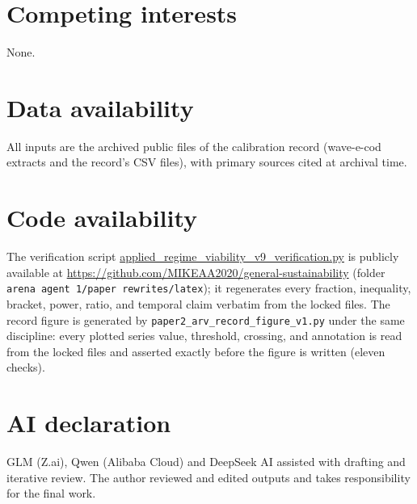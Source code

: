 \documentclass[10pt,twocolumn]{article}
\theoremstyle{plain}
\theoremstyle{remark}
\begin{document}
\section*{Competing interests}
None.

\section*{Data availability}
All inputs are the archived public files of the calibration record
(wave-e-cod extracts and the record's CSV files), with primary sources
cited at archival time.

\section*{Code availability}
The verification script
\url{applied_regime_viability_v9_verification.py}
is publicly available at
\url{https://github.com/MIKEAA2020/general-sustainability} (folder
\texttt{arena agent 1/paper rewrites/latex}); it regenerates every
fraction, inequality, bracket, power, ratio, and temporal claim
verbatim from the locked files. The record figure is generated by
\texttt{paper2\_arv\_record\_figure\_v1.py} under the same discipline:
every plotted series value, threshold, crossing, and annotation is read
from the locked files and asserted exactly before the figure is written
(eleven checks).

\section*{AI declaration}
GLM (Z.ai), Qwen (Alibaba Cloud) and DeepSeek AI assisted with drafting
and iterative review. The author reviewed and edited outputs and takes
responsibility for the final work.
\end{document}
